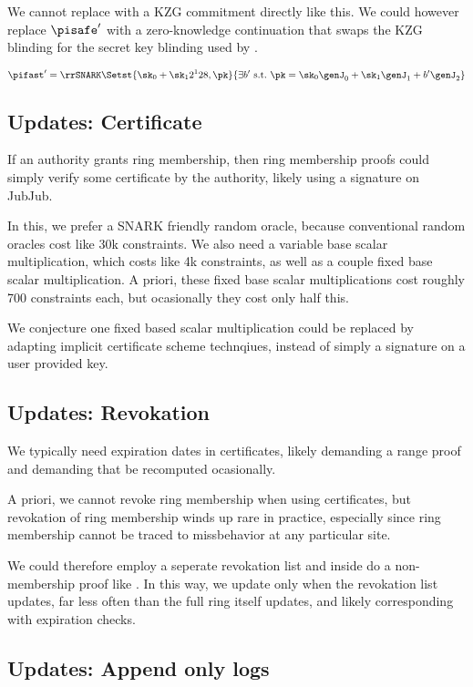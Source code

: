 We cannot replace \pifast with a KZG commitment directly like this.
We could however replace $\pisafe'$ with a zero-knowledge continuation
that swaps the KZG blinding for the secret key blinding used by \pifast.

$$ \pifast' = \rrSNARK \Setst{ \sk_0 + \sk_1 2^128, \pk }{ 
 \exists b' \textrm{\ s.t.\ }
 \pk = \sk_0 \genJ_0 + \sk_1 \genJ_1 + b' \genJ_2
} $$ %

\subsection{Updates: Certificate}

If an authority grants ring membership, then ring membership proofs
could simply verify some certificate by the authority, likely using
a signature on JubJub.

In this, we prefer a SNARK friendly random oracle,
because conventional random oracles cost like 30k constraints.
We also need a variable base scalar multiplication, which costs like
4k constraints, as well as a couple fixed base scalar multiplication.
A priori, these fixed base scalar multiplications cost roughly 700
constraints each, but ocasionally they cost only half this.   

We conjecture one fixed based scalar multiplication could be replaced
by adapting implicit certificate scheme technqiues,
 instead of simply a signature on a user provided key.

 \subsection{Updates: Revokation}

We typically need expiration dates in certificates, likely demanding
a range proof and demanding that \pifast be recomputed ocasionally. 

A priori, we cannot revoke ring membership when using certificates,
but revokation of ring membership winds up rare in practice, especially
since ring membership cannot be traced to missbehavior at any particular site.

We could therefore employ a seperate revokation list and inside \pifast
do a non-membership proof like \cite{???}.
In this way, we update \pifast only when the revokation list updates,
far less often than the full ring \ctx itself updates, and likely
corresponding with expiration checks.

\subsection{Updates: Append only logs}

